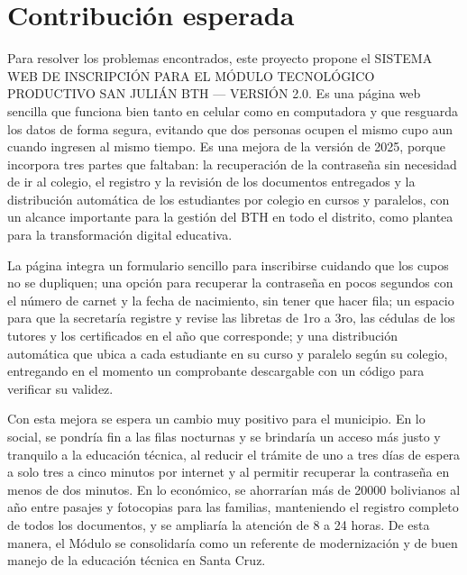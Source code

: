 \section{Contribución esperada}
\label{sec:contribucion_esperada}

Para resolver los problemas encontrados, este proyecto propone el SISTEMA WEB DE INSCRIPCIÓN PARA EL MÓDULO TECNOLÓGICO PRODUCTIVO SAN JULIÁN BTH --- VERSIÓN 2.0. Es una página web sencilla que funciona bien tanto en celular como en computadora y que resguarda los datos de forma segura, evitando que dos personas ocupen el mismo cupo aun cuando ingresen al mismo tiempo. Es una mejora de la versión de 2025, porque incorpora tres partes que faltaban: la recuperación de la contraseña sin necesidad de ir al colegio, el registro y la revisión de los documentos entregados y la distribución automática de los estudiantes por colegio en cursos y paralelos, con un alcance importante para la gestión del BTH en todo el distrito, como plantea \textcite{unesco2024} para la transformación digital educativa.

La página integra un formulario sencillo para inscribirse cuidando que los cupos no se dupliquen; una opción para recuperar la contraseña en pocos segundos con el número de carnet y la fecha de nacimiento, sin tener que hacer fila; un espacio para que la secretaría registre y revise las libretas de 1ro a 3ro, las cédulas de los tutores y los certificados en el año que corresponde; y una distribución automática que ubica a cada estudiante en su curso y paralelo según su colegio, entregando en el momento un comprobante descargable con un código para verificar su validez.

Con esta mejora se espera un cambio muy positivo para el municipio. En lo social, se pondría fin a las filas nocturnas y se brindaría un acceso más justo y tranquilo a la educación técnica, al reducir el trámite de uno a tres días de espera a solo tres a cinco minutos por internet y al permitir recuperar la contraseña en menos de dos minutos. En lo económico, se ahorrarían más de 20000 bolivianos al año entre pasajes y fotocopias para las familias, manteniendo el registro completo de todos los documentos, y se ampliaría la atención de 8 a 24 horas. De esta manera, el Módulo se consolidaría como un referente de modernización y de buen manejo de la educación técnica en Santa Cruz.
